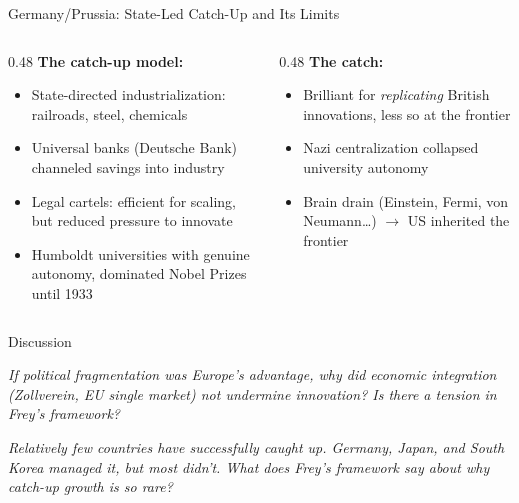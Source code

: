 \documentclass[aspectratio=169, 11pt]{beamer}
\begin{document}
\begin{frame}{Germany/Prussia: State-Led Catch-Up and Its Limits}
    \begin{columns}[T]
        \begin{column}{0.48\textwidth}
            \textbf{The catch-up model:}
            \begin{itemize}
                \item State-directed industrialization: railroads, steel, chemicals
                \item Universal banks (Deutsche Bank) channeled savings into industry
                \item Legal cartels: efficient for scaling, but reduced pressure to innovate
                \item Humboldt universities with genuine autonomy, dominated Nobel Prizes until 1933
            \end{itemize}
        \end{column}
        \begin{column}{0.48\textwidth}
            \textbf{The catch:}
            \begin{itemize}
                \item Brilliant for \textit{replicating} British innovations, less so at the frontier
                \item Nazi centralization collapsed university autonomy
                \item Brain drain (Einstein, Fermi, von Neumann\ldots) $\rightarrow$ US inherited the frontier
            \end{itemize}
        \end{column}
    \end{columns}
\end{frame}

\begin{frame}{Discussion}
    \begin{center}
        \large
        \textit{If political fragmentation was Europe's advantage, why did economic integration (Zollverein, EU single market) not undermine innovation? Is there a tension in Frey's framework?}

        \vspace{1.5em}

        \textit{Relatively few countries have successfully caught up. Germany, Japan, and South Korea managed it, but most didn't. What does Frey's framework say about why catch-up growth is so rare?}
    \end{center}
\end{frame}
\end{document}
